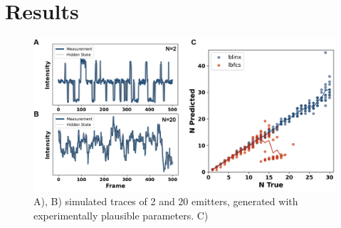 \section{Results}

\begin{figure}[ht]
  \includegraphics[width=\linewidth]{figures/comparison_lbfcs}
  \caption{A), B) simulated traces of 2 and 20 emitters, generated with experimentally plausible parameters. C) }
  \label{fig:results:comparison}
\end{figure}

